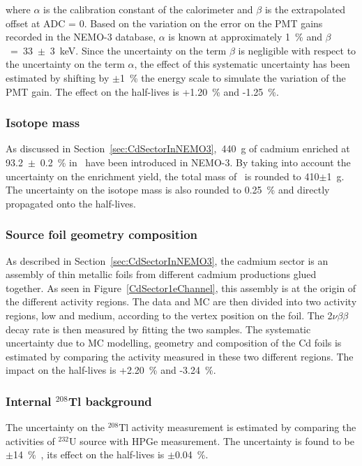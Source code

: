 \documentclass[main.tex]{subfiles}
\begin{document}
\NI where $\alpha$ is the calibration constant of the calorimeter and $\beta$ is the extrapolated offset at ADC = 0. Based on the variation on the error on the PMT gains recorded in the NEMO-3 database, $\alpha$ is known at approximately 1~\% and $\beta$~=~33~$\pm$~3~keV. Since the uncertainty on the term $\beta$ is negligible with respect to the uncertainty on the term $\alpha$, the effect of this systematic uncertainty has been estimated by shifting by $\pm$1~\% the energy scale to simulate the variation of the PMT gain. The effect on the half-lives is +1.20~\% and -1.25~\%.   


\subsubsection{Isotope mass}


\NI As discussed in Section~\ref{sec:CdSectorInNEMO3},~440~g of cadmium enriched at 93.2~$\pm$~0.2~\% in \Cd~have been introduced in NEMO-3. By taking into account the uncertainty on the enrichment yield, the total mass of \Cd ~is rounded to 410$\pm$1~g. The uncertainty on the isotope mass is also rounded to 0.25~\% and directly propagated onto the half-lives. 


\subsubsection{Source foil geometry composition}


\NI As described in Section~\ref{sec:CdSectorInNEMO3}, the cadmium sector is an assembly of thin metallic foils from different cadmium productions glued together. As seen in Figure~\ref{CdSector1eChannel}, this assembly is at the origin of the different activity regions. The data and MC are then divided into two activity regions, low and medium, according to the vertex position on the foil. The 2$\nu\beta\beta$ decay rate is then measured by fitting the two samples. The systematic uncertainty due to MC modelling, geometry and composition of the Cd foils is estimated by comparing the activity measured in these two different regions. The impact on the half-lives is +2.20~\% and -3.24~\%.


\subsubsection{Internal $^{\text{208}}$Tl background}


\NI The uncertainty on the $^\text{208}$Tl activity measurement is estimated by comparing the activities of $^{\text{232}}$U source with HPGe measurement. The uncertainty is found to be $\pm$14~\%~\cite{PositionPaperSummer}, its effect on the half-lives is $\pm$0.04~\%. 
 
\end{document}
